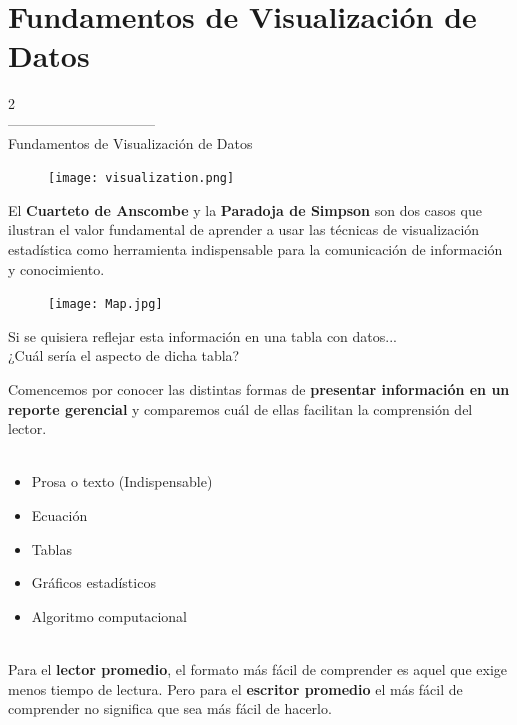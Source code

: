 \documentclass[aspectratio=169]{beamer}
\begin{document}

\section{Fundamentos de Visualización de Datos}
\begin{frame}
\begin{center}
\Huge
\textcolor{azulcesaclaro}{2\\
--------------------------------\\
Fundamentos de Visualización de Datos}
\end{center}
\end{frame}

\begin{frame}
\begin{figure}
\centering
\texttt{[image: visualization.png]}
\end{figure}
El \textbf{Cuarteto de Anscombe} y la \textbf{Paradoja de Simpson} son dos casos que ilustran el valor fundamental de aprender a usar las técnicas de visualización estadística como herramienta indispensable para la comunicación de información y conocimiento.
\end{frame}

\begin{frame}
\begin{figure}
\centering
\texttt{[image: Map.jpg]}
\end{figure}
Si se quisiera reflejar esta información en una tabla con datos...\\
¿Cuál sería el aspecto de dicha tabla?
\end{frame}

\begin{frame}
Comencemos por conocer las distintas formas de \textbf{presentar información en un reporte gerencial} y comparemos cuál de ellas facilitan la comprensión del lector.\\ 
\vspace{0.3cm}\\
\begin{itemize}
    \item Prosa o texto (Indispensable)
    \item Ecuación 
    \item Tablas
    \item Gráficos estadísticos
    \item Algoritmo computacional
\end{itemize}
\vspace{0.3cm}\\
Para el \textbf{lector promedio}, el formato más fácil de comprender es aquel que exige menos tiempo de lectura. Pero para el \textbf{escritor promedio} el más fácil de comprender no significa que sea más fácil de hacerlo.
\end{frame}
\end{document}

